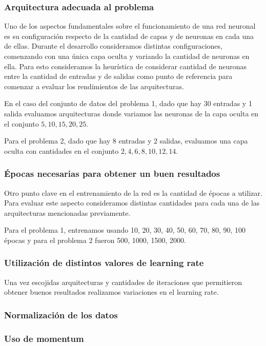 \documentclass[informe.tex]{subfiles}
\begin{document}
      \subsubsection{Arquitectura adecuada al problema}
	Uno de los aspectos fundamentales sobre el funcionamiento de una red neuronal es su configuraci\'on respecto de la cantidad de capas y de neuronas en cada una de ellas. Durante el desarrollo consideramos distintas configuraciones, comenzando con una \'unica capa oculta y variando la cantidad de neuronas en ella. Para esto consideramos la heurística de considerar cantidad de neuronas entre la cantidad de entradas y de salidas\cite{nnwithJava} como punto de referencia para comenzar a evaluar los rendimientos de las arquitecturas.
	
	En el caso del conjunto de datos del problema 1, dado que hay 30 entradas y 1 salida evaluamos arquitecturas donde variamos las neuronas de la capa oculta en el conjunto ${5,10,15,20,25}$. 
	
	Para el problema 2, dado que hay 8 entradas y 2 salidas, evaluamos una capa oculta con cantidades en el conjunto ${2,4,6,8,10,12,14}$.
      
      
      \subsubsection{\'Epocas necesarias para obtener un buen resultados}
	Otro punto clave en el entrenamiento de la red es la cantidad de \'epocas a utilizar. Para evaluar este aspecto consideramos distintas cantidades para cada una de las arquitecturas mencionadas previamente.
	
	Para el problema 1, entrenamos usando 10, 20, 30, 40, 50, 60, 70, 80, 90, 100 \'epocas y para el problema 2 fueron 500, 1000, 1500, 2000.
      
      
      \subsubsection{Utilizaci\'on de distintos valores de learning rate}
	Una vez escojidas arquitecturas y cantidades de iteraciones que permitieron obtener buenos resultados realizamos variaciones en el learning rate.
      
      \subsubsection{Normalización de los datos}
      
      \subsubsection{Uso de momentum}
      
      
      
  
\end{document}
